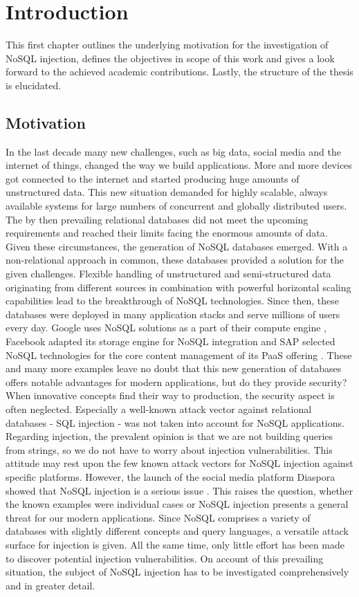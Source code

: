 \chapter{Introduction}
\label{cha:introduction}
This first chapter outlines the underlying motivation for the investigation of NoSQL injection, defines the objectives in scope of this work and gives a look forward to the achieved academic contributions. Lastly, the structure of the thesis is elucidated.

\section{Motivation}
In the last decade many new challenges, such as big data, social media and the internet of things, changed the way we build applications. More and more devices got connected to the internet and started producing huge amounts of unstructured data. This new situation demanded for highly scalable, always available systems for large numbers of concurrent and globally distributed users. The by then prevailing relational databases did not meet the upcoming requirements and reached their limits facing the enormous amounts of data. Given these circumstances, the generation of NoSQL databases emerged. With a non-relational approach in common, these databases provided a solution for the given challenges. Flexible handling of unstructured and semi-structured data originating from different sources in combination with powerful horizontal scaling capabilities lead to the breakthrough of NoSQL technologies. Since then, these databases were deployed in many application stacks and serve millions of users every day. Google uses NoSQL solutions as a part of their compute engine \cite{MongoDB_Google:2016}, Facebook adapted its storage engine for NoSQL integration \cite{MongoDB_Facebook:2016} and SAP selected NoSQL technologies for the core content management of its PaaS offering \cite{MongoDB_SAP:2016}. These and many more examples leave no doubt that this new generation of databases offers notable advantages for modern applications, but do they provide security? When innovative concepts find their way to production, the security aspect is often neglected. Especially a well-known attack vector against relational databases - SQL injection - was not taken into account for NoSQL applications. Regarding injection, the prevalent opinion is that we are not building queries from strings, so we do not have to worry about injection vulnerabilities. This attitude may rest upon the few known attack vectors for NoSQL injection against specific platforms. However, the launch of the social media platform Diaspora showed that NoSQL injection is a serious issue \cite{McKenzie:2010}. This raises the question, whether the known examples were individual cases or NoSQL injection presents a general threat for our modern applications. Since NoSQL comprises a variety of databases with slightly different concepts and query languages, a versatile attack surface for injection is given. All the same time, only little effort has been made to discover potential injection vulnerabilities. On account of this prevailing situation, the subject of NoSQL injection has to be investigated comprehensively and in greater detail.

